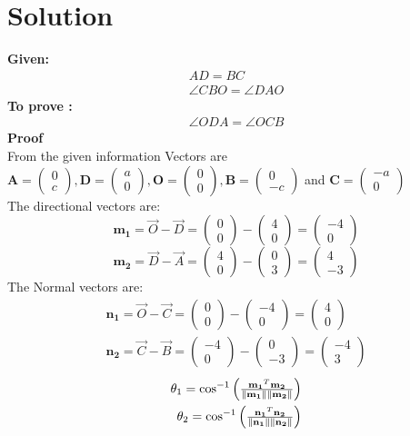 \documentclass[10pt,a4paper]{article}
\newcommand{\myvec}[1]{\ensuremath{\begin{pmatrix}#1\end{pmatrix}}}
\let\vec\mathbf
\begin{document}
\section{Solution}
\textbf{Given:}
\begin{align}
    AD=BC\\
    \angle{CBO}=\angle{DAO}
\end{align}
\textbf{To prove :}
\begin{align}
    \angle{ODA}=\angle{OCB}
\end{align}
\textbf{Proof}\\
From the given information Vectors are \\
$\vec{A}=\myvec{0\\c},\vec{D}=\myvec{a\\0},\vec{O}=\myvec{0\\0},\vec{B}=\myvec{0\\-c}$ and $\vec{C}=\myvec{-a\\0}$\\
The directional vectors are:
\begin{equation}
    \vec{m_1}=\Vec{O}-\Vec{D} = \myvec{0\\0}-\myvec{4\\0}=\myvec{-4\\0}
    \label{eq:m1}
\end{equation}
\begin{equation}
    \vec{m_2}=\Vec{D}-\Vec{A} = \myvec{4\\0}-\myvec{0\\3}=\myvec{4\\-3}\label{eq:m2}
\end{equation}
The Normal vectors are:
\begin{align}
    \vec{n_1}=\Vec{O}-\Vec{C}=\myvec{0\\0}-\myvec{-4\\0}=\myvec{4\\0}
    \label{eq:n1}\\
    \vec{n_2}=\Vec{C}-\Vec{B}=\myvec{-4\\0}-\myvec{0\\-3}=\myvec{-4\\3}
    \label{eq:n2}
\end{align}
\begin{align}
	\theta_1 =\cos^{-1}\myvec{\frac{\vec{m_1}^T\vec{m_2}}{\norm{\vec{m_1}}\norm{\vec{m_2}}}}
    \label{eq:theta1}\\
	\theta_2 =\cos^{-1}\myvec{\frac{\vec{n_1}^T\vec{n_2}}{\norm{\vec{n_1}}\norm{\vec{n_2}}}}
 \label{eq:theta2}
\end{align}
\end{document}
